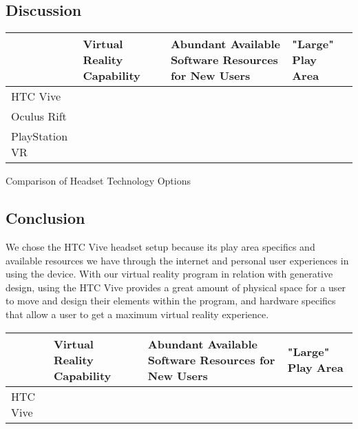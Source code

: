 \documentclass[letterpaper,10pt,onecolumn,compsoc]{IEEEtran}
\begin{document}
\newpage

\subsection{Discussion}

\begin{center}
\begin{tabular}{ | P{2.5cm} | P{4cm} | P{4.5cm} | P{3.5cm} |} 
 	\hline
 	 & Virtual Reality Capability & Abundant Available Software Resources for New Users & "Large" Play Area \\ 
 	\hline 		
 	HTC Vive & \checkmark & \checkmark & \checkmark \\ 
 	\hline
 	Oculus Rift & \checkmark & & \checkmark \\ 
 	\hline
 	PlayStation VR & \checkmark & & \\ 
 	\hline
\end{tabular}
\end{center}

\begin{center}
Comparison of Headset Technology Options
\end{center}

\subsection{Conclusion}

\noindent
We chose the HTC Vive headset setup because its play area specifics and available resources we have through the internet and personal user experiences in using the device. With our virtual reality program in relation with generative design, using the HTC Vive provides a great amount of physical space for a user to move and design their elements within the program, and hardware specifics that allow a user to get a maximum virtual reality experience.


\begin{center}
\begin{tabular}{ | P{2.5cm} | P{4cm} | P{4.5cm} | P{3.5cm} |} 
 	\hline
 	 & Virtual Reality Capability & Abundant Available Software Resources for New Users & "Large" Play Area \\ 
 	\hline 		
 	HTC Vive & \checkmark & \checkmark & \checkmark \\ 
 	\hline
\end{tabular}
\end{center}
\end{document}
